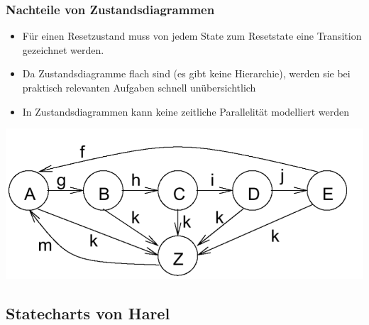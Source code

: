 \subsubsection{Nachteile von Zustandsdiagrammen}
\begin{multicols}{2}
  \begin{itemize}
    \item Für einen Resetzustand muss von jedem State zum Resetstate eine Transition gezeichnet werden.
    \item Da Zustandsdiagramme flach sind (es gibt keine Hierarchie), werden sie bei
          praktisch relevanten Aufgaben schnell unübersichtlich
    \item In Zustandsdiagrammen kann keine zeitliche Parallelität modelliert werden
  \end{itemize}
  \vfill\null
  \columnbreak
  \includegraphics[width=0.9\linewidth]{images/FSM/reset_state}
\end{multicols}

\newcommand{\kreis}[1]{\unitlength1ex\begin{picture}(2.5,2.5)%
    \put(0.75,0.75){\circle{3.5}}\put(0.75,0.75){\makebox(0,0){#1}}\end{picture}}

\subsection{Statecharts von Harel}
